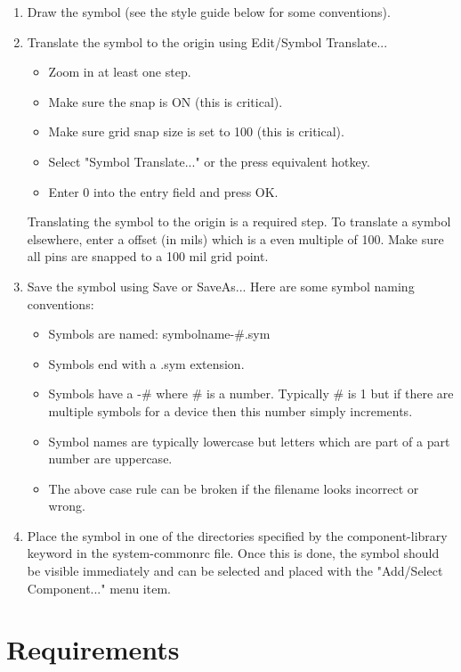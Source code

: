 \documentclass{article}
\begin{document}
\begin{enumerate}
\item Draw the symbol (see the style guide below for some conventions).
\item Translate the symbol to the origin using Edit/Symbol Translate...
\begin{itemize}
	\item Zoom in at least one step.
	\item Make sure the snap is ON (this is critical).
	\item Make sure grid snap size is set to 100 (this is critical).
	\item Select "Symbol Translate..." or the press equivalent hotkey.
	\item Enter 0 into the entry field and press OK.
\end{itemize}
Translating the symbol to the origin is a required step.  To translate
a symbol elsewhere, enter a offset (in mils) which is a even multiple
of 100.  Make sure all pins are snapped to a 100 mil grid point.
\item Save the symbol using Save or SaveAs...  Here are some symbol naming 
conventions:
\begin{itemize}
	\item Symbols are named: symbolname-\#.sym
	\item Symbols end with a .sym extension.
	\item Symbols have a -\# where \# is a number.  Typically \# is
              1 but if there are multiple symbols for a device then
              this number simply increments.
	\item Symbol names are typically lowercase but letters which
              are part of a part number are uppercase.
	\item The above case rule can be broken if the filename
              looks incorrect or wrong.
\end{itemize}
\item Place the symbol in one of the directories specified by the
      component-library keyword in the system-commonrc file.  Once this is
      done, the symbol should be visible immediately and can be selected
      and placed with the "Add/Select Component..." menu item.

\end{enumerate}

\newpage

\section{Requirements}
\end{document}
